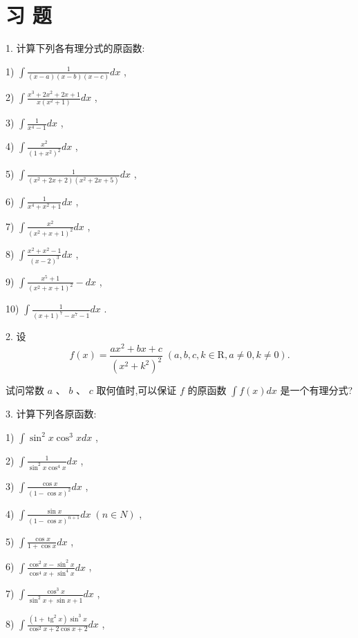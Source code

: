 \section*{习 题}

1. 计算下列各有理分式的原函数:

1) $\int \frac{1}{\left( {x - a}\right) \left( {x - b}\right) \left( {x - c}\right) }{dx}$ ,

2) $\int \frac{{x}^{3} + 2{x}^{2} + {2x} + 1}{x\left( {{x}^{2} + 1}\right) }{dx}$ ,

3) $\int \frac{1}{{x}^{4} - 1}{dx}$ ,

4) $\int \frac{{x}^{2}}{{\left( 1 + {x}^{2}\right) }^{2}}{dx}$ ,

5) $\int \frac{1}{\left( {{x}^{2} + {2x} + 2}\right) \left( {{x}^{2} + {2x} + 5}\right) }{dx}$ ,

6) $\int \frac{1}{{x}^{4} + {x}^{2} + 1}{dx}$ ,

7) $\int \frac{{x}^{2}}{{\left( {x}^{2} + x + 1\right) }^{2}}{dx}$ ,

8) $\int \frac{{x}^{2} + {x}^{2} - 1}{{\left( x - 2\right) }^{3}}{dx}$ ,

9) $\int \frac{{x}^{5} + 1}{{\left( {x}^{2} + x + 1\right) }^{2}} - {dx}$ ,

10) $\int \frac{1}{{\left( x + 1\right) }^{7} - {x}^{7} - 1}{dx}$ .

2. 设
$$f\left( x\right)  = \frac{a{x}^{2} + {bx} + c}{{\left( {x}^{2} + {k}^{2}\right) }^{2}}\;\left( {a,b,c,k \in  \mathrm{R},a \neq  0,k \neq  0}\right) .$$

试问常数 $a\text{ 、 }b\text{ 、 }c$ 取何值时,可以保证 $f$ 的原函数 $\int f\left( x\right) {dx}$ 是一个有理分式?

3. 计算下列各原函数:

1) $\int {\sin }^{2}x{\cos }^{3}{xdx}$ ,

2) $\int \frac{1}{{\sin }^{2}x{\cos }^{4}x}{dx}$ ,

3) $\int \frac{\cos x}{{\left( 1 - \cos x\right) }^{2}}{dx}$ ,

4) $\int \frac{\sin x}{{\left( 1 - \cos x\right) }^{n + 1}}{dx}\;\left( {n \in  N}\right)$ ,

5) $\int \frac{\cos x}{1 + \cos x}{dx}$ ,

6) $\int \frac{{\cos }^{2}x - {\sin }^{2}x}{{\cos }^{4}x + {\sin }^{4}x}{dx}$ ,

7) $\int \frac{{\cos }^{3}x}{{\sin }^{2}x + \sin x + 1}{dx}$ ,

8) $\int \frac{\left( {1 + {\operatorname{tg}}^{2}x}\right) {\sin }^{3}x}{{\cos }^{2}x + 2\cos x + 2}{dx}$ ,

